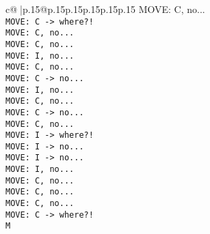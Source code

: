 \documentclass{article}
\begin{document}
{\begin{supertabular}{c@{$\;$}|p{.15\linewidth}@{}p{.15\linewidth}p{.15\linewidth}p{.15\linewidth}p{.15\linewidth}p{.15\linewidth}}
{{{  MOVE: C, no...\\ \tt  MOVE: C -> where?!\\ \tt  MOVE: C, no...\\ \tt  MOVE: C, no...\\ \tt  MOVE: I, no...\\ \tt  MOVE: C, no...\\ \tt  MOVE: C -> no...\\ \tt  MOVE: I, no...\\ \tt  MOVE: C, no...\\ \tt  MOVE: C -> no...\\ \tt  MOVE: C, no...\\ \tt  MOVE: I -> where?!\\ \tt  MOVE: I -> no...\\ \tt  MOVE: I -> no...\\ \tt  MOVE: I, no...\\ \tt  MOVE: C, no...\\ \tt  MOVE: C, no...\\ \tt  MOVE: C, no...\\ \tt  MOVE: C -> where?!\\ \tt  M}}}
\end{supertabular}}
\end{document}
